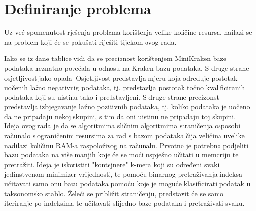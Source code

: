 \documentclass[times, utf8, zavrsni]{fer}
\begin{document}
{\chapter{Definiranje problema}
Uz već spomenutost rješenja problema korištenja velike količine resursa, nailazi se na problem koji će se pokušati riješiti tijekom ovog rada.
\begin{table}[hbp]
	\centering
	\caption{Isječak iz Tablice 1.1}
	\label{IsjecakTablice}
\end{table}

Iako se iz dane tablice vidi da se preciznost korištenjem MiniKraken baze podataka neznatno povećala u odnosu na Kraken bazu podataka. S druge strane osjetljivost jako opada. Osjetljivost predstavlja mjeru koja određuje postotak uočenih lažno negativnig podataka, tj. predstavlja postotak točno kvalificiranih podataka koji su uistinu tako i predstavljeni. S druge strane precizonst predstavlja izbjegavanje lažno pozitivnih podataka, tj. koliko podataka je uočeno da ne pripadaju nekoj skupini, s tim da oni uistinu ne pripadaju toj skupini.\\Ideja ovog rada je da se algoritmima sličnim algoritmima straničenja osposobi računalo s ograničenim resursima za rad s bazom podataka čija veličina uvelike nadilazi količinu RAM-a raspoloživog na računalu. Prvotno je potrebno podjeliti bazu podataka na više manjih koje će se moći uspješno učitati u memoriju te pretražiti. Ideja je iskoristiti "kontejnere" k-mera koji su određeni svaki jedinstvenom minimizer vrijednosti, te pomoću binarnog pretraživanja indeksa učitavati samo onu bazu podataka pomoću koje je moguće klasificirati podatak u taksonomsko stablo. Želeći se približit straničenju, predstavit će se samo iteriranje po indeksima te učitavati slijedno baze podataka i pretraživati svaku.
}
\end{document}

